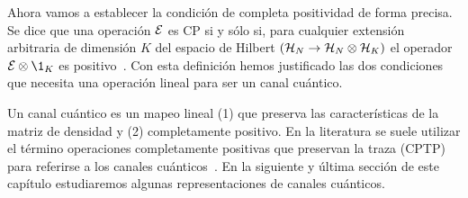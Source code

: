 Ahora vamos a establecer la condición de completa positividad 
de forma precisa. Se dice que una operación $\mathcal{E}$ es CP si 
y sólo si, para cualquier extensión arbitraria de dimensión $K$ 
del espacio de Hilbert $(\mathcal{H}_N \rightarrow \mathcal{H}_N \otimes \mathcal{H}_K)$ 
el operador $\E\otimes\1_K$ es positivo~\cite{bengtsson_zyczkowski_2017}. 
Con esta definición hemos justificado las dos condiciones que 
necesita una operación lineal para ser un canal cuántico.

Un canal cuántico es un mapeo lineal  (1) que preserva las características
de la matriz de densidad y (2) completamente positivo. 
En la literatura se suele utilizar el término operaciones 
completamente positivas que preservan la traza 
(CPTP) para referirse a los canales 
cuánticos~\cite{bengtsson_zyczkowski_2017}. 
En la siguiente y última sección de este capítulo estudiaremos 
algunas representaciones de canales cuánticos. 


%
%
%

